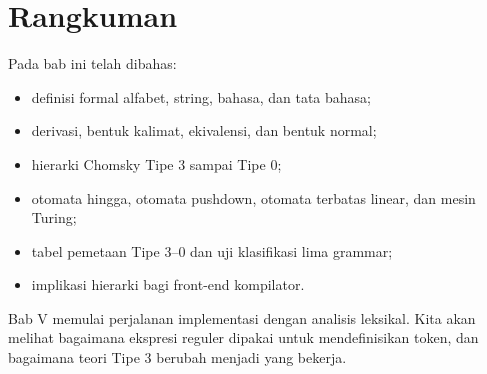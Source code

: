 \section*{Rangkuman}

Pada bab ini telah dibahas:
\begin{itemize}[leftmargin=*]
  \item definisi formal alfabet, string, bahasa, dan tata bahasa;
  \item derivasi, bentuk kalimat, ekivalensi, dan bentuk normal;
  \item hierarki Chomsky Tipe 3 sampai Tipe 0;
  \item otomata hingga, otomata pushdown, otomata terbatas linear,
        dan mesin Turing;
  \item tabel pemetaan Tipe 3--0 dan uji klasifikasi lima grammar;
  \item implikasi hierarki bagi front-end kompilator.
\end{itemize}

Bab V memulai perjalanan implementasi dengan analisis leksikal. Kita
akan melihat bagaimana ekspresi reguler dipakai untuk mendefinisikan
token, dan bagaimana teori Tipe 3 berubah menjadi  yang
bekerja.
